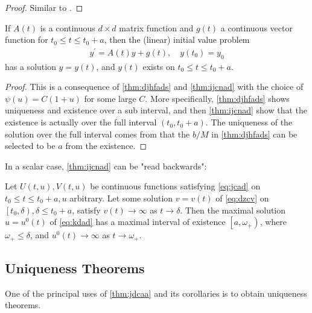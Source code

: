 \documentclass{article}
\begin{document}
\begin{proof}
Similar to \cite{rudin1976principles}.
\end{proof}
\begin{cora}\label{cor:dgdfa}
If $A(t)$ is a continuous $d \times d$ matrix function and $g(t)$ a continuous vector function for $t_{0} \le t \le t_{0}+a$, then the (linear) initial value problem
\begin{align}
    y^{\prime}=A(t) y+g(t), \quad y\left(t_{0}\right)=y_{0}
\end{align}
has a  solution $y=y(t)$, and $y(t)$ exists on $t_{0} \le t \le t_{0}+a$.
\end{cora} 
\begin{proof}
This is a consequence of \cref{thm:djhfads} and \cref{thm:ijcnad} with the choice of $\psi(u)=C(1+u)$ for some large $C$. More specifically, \cref{thm:djhfads} shows uniqueness and existence over a sub interval, and then \cref{thm:ijcnad} show that the existence  is actually over the full interval $(t_0,t_0+a)$. The uniqueness of the solution over the full interval comes from that the $b/M$ in \cref{thm:djhfads} can be selected to be $a$ from the existence. 
\end{proof}

In a scalar case, \cref{thm:ijcnad} can be "read backwards":
\begin{cora}
Let $U(t, u), V(t, u)$ be continuous functions satisfying \cref{eq:jcad} on $t_{0} \le t \le t_{0}+a, u$ arbitrary. Let some solution $v=v(t)$ of \cref{eq:dzcv} on $\left[t_{0}, \delta\right), \delta \le t_{0}+a$, satisfy $v(t) \rightarrow \infty$ as $t \rightarrow \delta$. Then the maximal solution $u=u^{0}(t)$ of \cref{eq:kdad} has a maximal interval of existence $\left[a, \omega_{+}\right)$, where $\omega_{+} \le \delta$, and $u^{0}(t) \rightarrow \infty$ as $t \rightarrow \omega_{+}$.
\end{cora}
\subsection{Uniqueness Theorems}
One of the principal uses of \cref{thm:jdcaa} and its corollaries is to obtain uniqueness theorems. 
\end{document}

